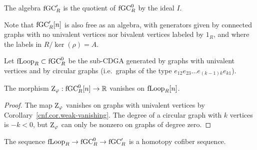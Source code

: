 \begin{definition}
  The algebra $\mathrm{fGC}'_{R}$ is the quotient of $\mathrm{fGC}^{0}_{R}$ by the ideal $I$.
\end{definition}

Note that $\mathrm{fGC}'_{R}[n]$ is also free as an algebra, with generators given by connected graphs with no univalent vertices nor bivalent vertices labeled by $1_{R}$, and where the labels in $R / \ker(\rho) = A$.

\begin{definition}
  Let $\mathrm{fLoop}_{R} \subset \mathrm{fGC}^{0}_{R}$ be the sub-CDGA generated by graphs with univalent vertices and by circular graphs (i.e.\ graphs of the type $e_{12} e_{23} \dots e_{(k-1)k} e_{k1}$).
\end{definition}

\begin{lemma}
  The morphism $\mathrm{Z}_{\varphi} : \mathrm{fGC}^{0}_{R}[n] \to \mathbb{R}$ vanishes on $\mathrm{fLoop}_{R}[n]$.
\end{lemma}

\begin{proof}
  The map $\mathrm{Z}_{\varphi}$ vanishes on graphs with univalent vertices by Corollary~\ref{cnf.cor.weak-vanishing}.
  The degree of a circular graph with $k$ vertices is $-k < 0$, but $\mathrm{Z}_{\varphi}$ can only be nonzero on graphs of degree zero.
\end{proof}

\begin{proposition}
  \label{cnf.prop.fgcr-cofib}
  The sequence $\mathrm{fLoop}_{R} \to \mathrm{fGC}^{0}_{R} \to \mathrm{fGC}'_{R}$ is a homotopy cofiber sequence.
\end{proposition}

